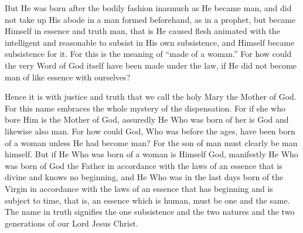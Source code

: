 But He was born after the bodily fashion inasmuch as He became man, and did not take up His abode in a man formed beforehand, as in a prophet, but became Himself in essence and truth man, that is He caused flesh animated with the intelligent and reasonable to subsist in His own subsistence, and Himself became subsistence for it. For this is the meaning of “made of a woman.” For how could the very Word of God itself have been made under the law, if He did not become man of like essence with ourselves?

Hence it is with justice and truth that we call the holy Mary the Mother of God. For this name embraces the whole mystery of the dispensation. For if she who bore Him is the Mother of God, assuredly He Who was born of her is God and likewise also man. For how could God, Who was before the ages, have been born of a woman unless He had become man? For the son of man must clearly be man himself. But if He Who was born of a woman is Himself God, manifestly He Who was born of God the Father in accordance with the laws of an essence that is divine and knows no beginning, and He Who was in the last days born of the Virgin in accordance with the laws of an essence that has beginning and is subject to time, that is, an essence which is human, must be one and the same. The name in truth signifies the one subsistence and the two natures and the two generations of our Lord Jesus Christ.

